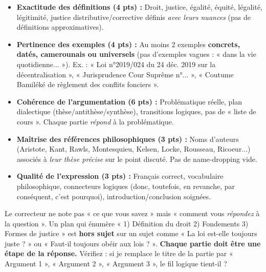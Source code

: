 \documentclass[11pt]{article}
\begin{document}
\begin{aretenir}
\begin{itemize}
    \item \textbf{Exactitude des définitions (4 pts) :} Droit, justice, égalité, équité, légalité, légitimité, justice distributive/corrective définis \emph{avec leurs nuances} (pas de définitions approximatives).
    \item \textbf{Pertinence des exemples (4 pts) :} Au moins 2 exemples \textbf{concrets, datés, camerounais ou universels} (pas d'exemples vagues : « dans la vie quotidienne... »). Ex. : « Loi n°2019/024 du 24 déc. 2019 sur la décentralisation », « Jurisprudence Cour Suprême n°... », « Coutume Bamiléké de règlement des conflits fonciers ».
    \item \textbf{Cohérence de l'argumentation (6 pts) :} Problématique réelle, plan dialectique (thèse/antithèse/synthèse), transitions logiques, pas de « liste de cours ». Chaque partie \emph{répond} à la problématique.
    \item \textbf{Maîtrise des références philosophiques (3 pts) :} Noms d'auteurs (Aristote, Kant, Rawls, Montesquieu, Kelsen, Locke, Rousseau, Ricoeur...) associés à \emph{leur thèse précise} sur le point discuté. Pas de name-dropping vide.
    \item \textbf{Qualité de l'expression (3 pts) :} Français correct, vocabulaire philosophique, connecteurs logiques (donc, toutefois, en revanche, par conséquent, c'est pourquoi), introduction/conclusion soignées.
\end{itemize}
\end{aretenir}

\begin{attention}
Le correcteur ne note pas « ce que vous savez » mais « comment vous \emph{répondez} à la question ». Un plan qui énumère « 1) Définition du droit 2) Fondements 3) Formes de justice » est \textbf{hors sujet} sur un sujet comme « La loi est-elle toujours juste ? » ou « Faut-il toujours obéir aux lois ? ». \textbf{Chaque partie doit être une étape de la réponse.} Vérifiez : si je remplace le titre de la partie par « Argument 1 », « Argument 2 », « Argument 3 », le fil logique tient-il ?
\end{attention}
\end{document}
